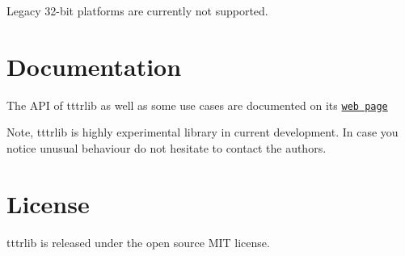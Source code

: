 Legacy 32-\/bit platforms are currently not supported.

\section*{Documentation}

The A\+PI of tttrlib as well as some use cases are documented on its \href{https://tpeulen.github.io/tttrlib}{\tt web page}

Note, tttrlib is highly experimental library in current development. In case you notice unusual behaviour do not hesitate to contact the authors.

\section*{License}

tttrlib is released under the open source M\+IT license. 